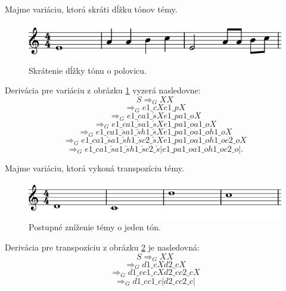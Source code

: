 \begin{example}
Majme variáciu, ktorá skráti dĺžku tónov témy.
\begin{figure}[H]
    \centering
    \includegraphics[scale=0.4]{thesis/obrazky-figures/dimivar.png}
    \caption{Skrátenie dĺžky tónu o polovicu.}
    \label{fig:skratenievar}
    \end{figure}
    Derivácia pre variáciu z obrázku \ref{fig:skratenievar} vyzerá nasledovne:
    $$ S \Rightarrow_G XX $$
    $$\Rightarrow_G e1\_cXe1\_pX $$
    $$\Rightarrow_G e1\_ca1\_\check{s}Xe1\_pa1\_oX $$
    $$\Rightarrow_G e1\_ca1\_\check{s}a1\_\check{s}Xe1\_pa1\_oa1\_oX $$
    $$\Rightarrow_G e1\_ca1\_\check{s}a1\_\check{s}h1\_\check{s}Xe1\_pa1\_oa1\_oh1\_oX $$
    $$\Rightarrow_G e1\_ca1\_\check{s}a1\_\check{s}h1\_\check{s}c2\_\check{s}Xe1\_pa1\_oa1\_oh1\_oc2\_oX $$
    $$\Rightarrow_G e1\_ca1\_\check{s}a1\_\check{s}h1\_\check{s}c2\_\check{s}|e1\_pa1\_oa1\_oh1\_oc2\_o|.$$
\end{example}

\begin{example}
Majme variáciu, ktorá vykoná transpozíciu témy.
\begin{figure}[H]
    \centering
    \includegraphics[scale=0.4]{thesis/obrazky-figures/transpos.png}
    \caption{Postupné zníženie témy o jeden tón.}
    \label{fig:transpovar}
    \end{figure}
    Derivácia pre transpozíciu z obrázku \ref{fig:transpovar} je nasledovná:
    $$ S \Rightarrow_G XX $$
    $$ \Rightarrow_G d1\_cXd2\_cX $$
    $$ \Rightarrow_G d1\_cc1\_cXd2\_cc2\_cX $$
    $$ \Rightarrow_G d1\_cc1\_c|d2\_cc2\_c| $$
\end{example}

